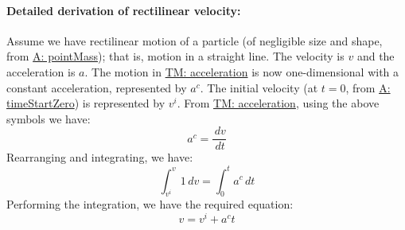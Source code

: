 \documentclass[12pt]{article}
\begin{document}
\paragraph{Detailed derivation of rectilinear velocity:}
\label{GD:rectVelDeriv}
Assume we have rectilinear motion of a particle (of negligible size and shape, from \hyperref[pointMass]{A: pointMass}); that is, motion in a straight line. The velocity is $v$ and the acceleration is $a$. The motion in \hyperref[TM:acceleration]{TM: acceleration} is now one-dimensional with a constant acceleration, represented by ${a^{c}}$. The initial velocity (at $t=0$, from \hyperref[timeStartZero]{A: timeStartZero}) is represented by ${v^{i}}$. From \hyperref[TM:acceleration]{TM: acceleration}, using the above symbols we have:
\begin{displaymath}
{a^{c}}=\frac{\,dv}{\,dt}
\end{displaymath}
Rearranging and integrating, we have:
\begin{displaymath}
\int_{{v^{i}}}^{v}{1}\,dv=\int_{0}^{t}{{a^{c}}}\,dt
\end{displaymath}
Performing the integration, we have the required equation:
\begin{displaymath}
v={v^{i}}+{a^{c}} t
\end{displaymath}
\par~
\end{document}
